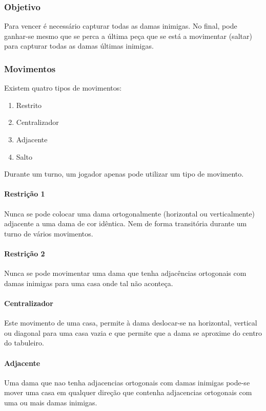 \documentclass[a4paper,11pt,titlepage]{article}
\begin{document}
\subsubsection{Objetivo}
Para vencer é necessário capturar todas as damas inimigas. No final, pode ganhar-se mesmo que se perca a última peça que se está a movimentar (saltar) para capturar todas as damas últimas inimigas.

\subsubsection{Movimentos}
Existem quatro tipos de movimentos:
\begin{enumerate}
  \item Restrito
  \item Centralizador
  \item Adjacente
  \item Salto
\end{enumerate}
Durante um turno, um jogador apenas pode utilizar um tipo de movimento.

\paragraph{Restrição 1}
Nunca se pode colocar uma dama ortogonalmente (horizontal ou verticalmente) adjacente a uma dama de cor idêntica. Nem de forma transitória durante um turno de vários movimentos.

\paragraph{Restrição 2}
Nunca se pode movimentar uma dama que tenha adjacências ortogonais com damas inimigas para uma casa onde tal não aconteça.

\paragraph{Centralizador}
Este movimento de uma casa, permite à dama deslocar-se na horizontal, vertical ou diagonal para uma casa vazia e que permite que a dama se aproxime do centro do tabuleiro.


\paragraph{Adjacente}
Uma dama que nao tenha adjacencias ortogonais com damas inimigas pode-se mover uma casa em qualquer direção que  contenha adjacencias ortogonais com uma ou mais damas inimigas.
\end{document}

